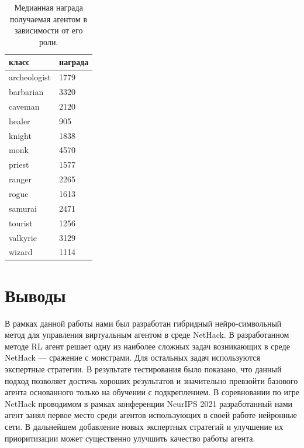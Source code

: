 \begin{table} [htbp]
    \centering
    \begin{threeparttable}
        \caption{Медианная награда получаемая агентом в зависимости от его роли.}\label{tab:raph_analize}
        \begin{tabular}{| p{8cm} || p{8cm} |}
            \hline
            \hline
            класс & награда \\
            \hline
            archeologist & 1779 \\
            barbarian & 3320 \\
            caveman & 2120 \\
            healer & 905 \\
            knight & 1838 \\
            monk & 4570 \\
            priest & 1577 \\
            ranger & 2265 \\
            rogue & 1613 \\
            samurai & 2471 \\
            tourist & 1256 \\
            valkyrie & 3129 \\
            wizard & 1114 \\
            \hline
            \hline
        \end{tabular}
    \end{threeparttable}
\end{table}

\section{Выводы}

В рамках данной работы нами был разработан гибридный нейро-символьный метод для управления
виртуальным агентом в среде NetHack. В разработанном методе RL агент решает одну из наиболее сложных задач возникающих в среде NetHack --- сражение с монстрами. Для остальных задач используются экспертные стратегии. В результате тестирования было показано, что данный подход позволяет достичь хороших результатов и значительно превзойти базового агента основанного только на обучении с подкреплением. В соревновании по игре NetHack проводимом в рамках конференции NeurIPS 2021 разработанный нами агент занял первое место среди агентов использующих в своей работе нейронные сети. В дальнейшем добавление новых экспертных стратегий и улучшение их приоритизации может существенно улучшить качество работы агента. 


\clearpage
